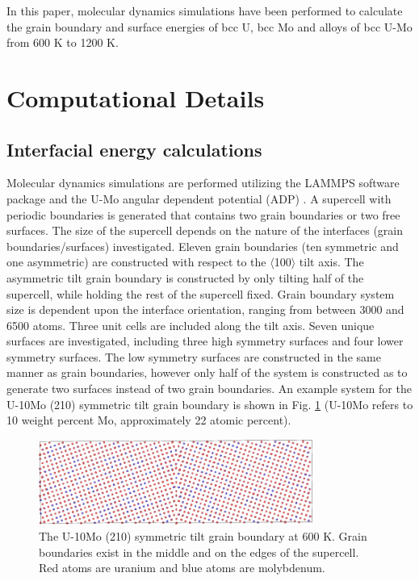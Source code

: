 \documentclass[review]{elsarticle}
\begin{document}
In this paper, molecular dynamics simulations have been performed to calculate the grain boundary and surface energies of bcc U, bcc Mo and alloys of bcc U-Mo from 600 K to 1200 K. 

\section{Computational Details}
\subsection{Interfacial energy calculations}
Molecular dynamics simulations are performed utilizing the LAMMPS \cite{plimpton1995} software package and the U-Mo angular dependent potential (ADP) \cite{smirnovaADP}. A supercell with periodic boundaries is generated that contains two grain boundaries or two free surfaces. The size of the supercell depends on the nature of the interfaces (grain boundaries/surfaces) investigated. Eleven grain boundaries (ten symmetric and one asymmetric) are constructed with respect to the $\langle$100$\rangle$ tilt axis. The asymmetric tilt grain boundary is constructed by only tilting half of the supercell, while holding the rest of the supercell fixed. Grain boundary system size is dependent upon the interface orientation, ranging from between 3000 and 6500 atoms. Three unit cells are included along the tilt axis. Seven unique surfaces are investigated, including three high symmetry surfaces and four lower symmetry surfaces. The low symmetry surfaces are constructed in the same manner as grain boundaries, however only half of the system is constructed as to generate two surfaces instead of two grain boundaries. An example system for the U-10Mo (210) symmetric tilt grain boundary is shown in Fig. \ref{fig:gbex} (U-10Mo refers to 10 weight percent Mo, approximately 22 atomic percent).

\begin{figure}[h]
 \centering
 \includegraphics[width=0.8\textwidth]{gbex.png} 
 \caption{The U-10Mo (210) symmetric tilt grain boundary at 600 K. Grain boundaries exist in the middle and on the edges of the supercell. Red atoms are uranium and blue atoms are molybdenum.}
 \label{fig:gbex}
\end{figure}
\end{document}
